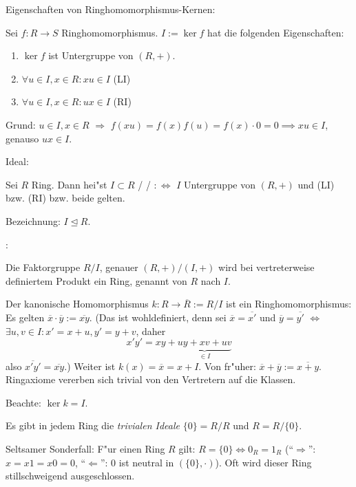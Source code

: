 \remark Eigenschaften von Ringhomomorphismus-Kernen:{
  Sei $f:R\to S$ Ringhomomorphismus. $I:=\ker f$ hat die folgenden Eigenschaften:
  \begin{enumerate}
    \item $\ker f$ ist Untergruppe von $(R,+)$.
    \item $\forall u\in I,x\in R:xu\in I$ (LI)
    \item $\forall u\in I,x\in R:ux\in I$ (RI)
    \end{enumerate}
  Grund: $u\in I,x\in R$ $\Rightarrow$ $f(xu)=f(x)f(u)=f(x)\cdot 0=0\implies xu\in I$, genauso
  $ux\in I$.
  }
 Ideal:{
  Sei $R$ Ring. Dann hei"st $I\subset R$ 
  \emph{}/
  \emph{}/
  \emph{}
  $:\iff$
  $I$ Untergruppe von $(R,+)$ und (LI) bzw. (RI) bzw. beide gelten.
  
  Bezeichnung: $I\unlhd R$.
  }
\remark:{
  Die Faktorgruppe $R/I$, genauer $(R,+)/(I,+)$ wird bei vertreterweise
  definiertem Produkt ein Ring, genannt \emph{}
  von $R$ nach $I$. 

  Der kanonische Homomorphismus 
  $k:R\to\overline R:=R/I$ ist ein Ringhomomorphismus:
  Es gelten $\overline x\cdot \overline y:=\overline{xy}$.
  (Das ist wohldefiniert, denn sei 
  $\overline x=\overline{x'}$ und
  $\overline y=\overline{y'}$ $\iff$
  $\exists u,v\in I:x'=x+u,y'=y+v$, daher 
  \[x'y'=xy+\underbrace{uy+xv+uv}_{\in I}
    \]
  also $\overline{x'y'}=\overline{xy}$.)
  Weiter ist $k(x)=\overline x=x+I$.
  Von fr"uher: $\overline x+\overline y:=\overline{x+y}$.
  Ringaxiome vererben sich trivial von den Vertretern auf die Klassen.
  
  Beachte: $\ker k=I$.
  
  Es gibt in jedem Ring die \emph{trivialen Ideale} $\{0\}=R/R$ und $R=R/ \{0\}$.
  }
\remark Seltsamer Sonderfall:{
  F"ur einen Ring $R$ gilt: $R=\{0\}\iff 0_R=1_R$ 
  (``$\Rightarrow$'': $x=x1=x0=0$, ``$\Leftarrow$'': 0 ist neutral in $(\{0\},\cdot)$).
  Oft wird dieser Ring stillschweigend ausgeschlossen.
  }
